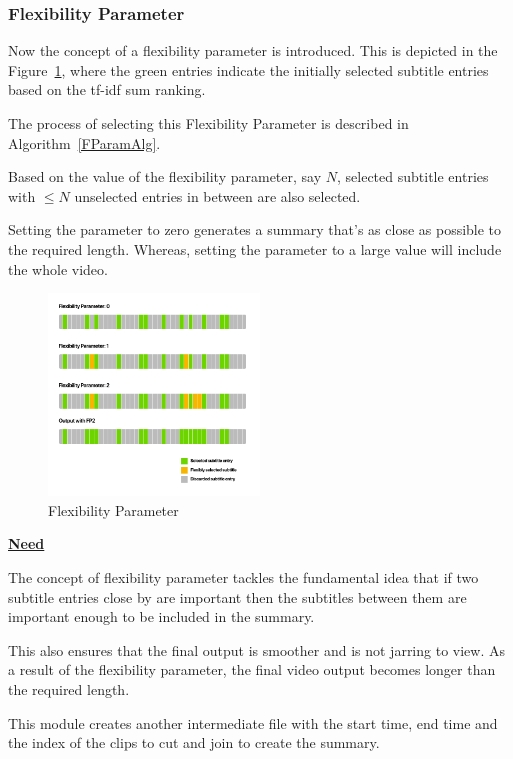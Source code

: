     	\subsubsection{Flexibility Parameter}
    		Now the concept of a flexibility parameter is introduced. This is depicted in the Figure~\ref{flexparam}, where the green entries indicate the initially selected subtitle entries based on the tf-idf sum ranking. 

            The process of selecting this Flexibility Parameter is described in Algorithm~\ref{FParamAlg}.
            
    		Based on the value of the flexibility parameter, say \(N\), selected subtitle entries with \(\leq N\) unselected entries in between are also selected.
    				
    		Setting the parameter to zero generates a summary that's as close as possible to the required length. Whereas, setting the parameter to a large value will include the whole video.
    				
    				\begin{figure}[ht]
    				\centering
    					\includegraphics[width=0.5\textwidth, keepaspectratio=true]{Flexibility}	
    					\caption{Flexibility Parameter}
    					\label{flexparam}
    				\end{figure}
    				
    				\begin{mdframed}
    					\textbf{\underline{Need}}
    					
    						The concept of flexibility parameter tackles the fundamental idea that if two subtitle entries close by are important then the subtitles between them are important enough to be included in the summary.
    						
    						This also ensures that the final output is smoother and is not jarring to view. As a result of the flexibility parameter, the final video output becomes longer than the required length.
    				\end{mdframed}
    			This module creates another intermediate file with the start time, end time and the index of the clips to cut and join to create the summary. 
		
